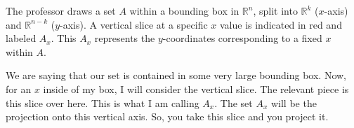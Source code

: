 \begin{math-stroke}
\begin{center}
\end{center}
\begin{explanation-of-steps}
The professor draws a set $A$ within a bounding box in $\mathbb{R}^n$, split into $\mathbb{R}^k$ ($x$-axis) and $\mathbb{R}^{n-k}$ ($y$-axis). A vertical slice at a specific $x$ value is indicated in red and labeled $A_x$. This $A_x$ represents the $y$-coordinates corresponding to a fixed $x$ within $A$.
\end{explanation-of-steps}
\end{math-stroke}

\begin{spoken-clean}[00:02:20 - 00:03:37]
We are saying that our set is contained in some very large bounding box. Now, for an $x$ inside of my box, I will consider the vertical slice. The relevant piece is this slice over here. This is what I am calling $A_x$. The set $A_x$ will be the projection onto this vertical axis. So, you take this slice and you project it.
\end{spoken-clean}

